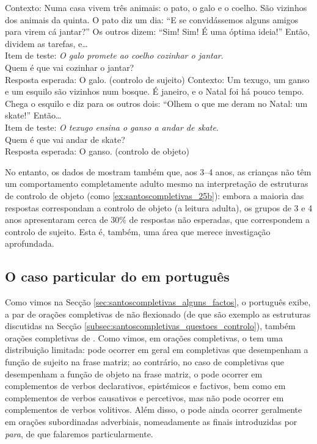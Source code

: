 \documentclass[output=paper]{LSP/langsci}
\begin{document}
\ea\label{ex:santoscompletivas_25}
\ea\label{ex:santoscompletivas_25a} Contexto: Numa casa vivem três animais: o pato, o galo e o coelho. São vizinhos dos animais da quinta. O pato diz um dia: ``E se convidássemos alguns amigos para virem cá jantar?'' Os outros dizem: ``Sim! Sim! É uma óptima ideia!'' Então, dividem as tarefas, e\ldots\\
Item de teste: \textit{O galo promete ao coelho cozinhar o jantar}.\\
Quem é que vai cozinhar o jantar?\\
Resposta esperada: O galo. (controlo de sujeito)
\ex\label{ex:santoscompletivas_25b} Contexto: Um texugo, um ganso e um esquilo são vizinhos num bosque. É janeiro, e o Natal foi há pouco tempo. Chega o esquilo e diz para os outros dois: ``Olhem o que me deram no Natal: um skate!'' Então\ldots\\
Item de teste: \textit{O texugo ensina o ganso a andar de skate}.\\
Quem é que vai andar de skate?\\
Resposta esperada: O ganso. (controlo de objeto)
\zl

No entanto, os dados de \citet{agostinho2014} mostram também que, aos 3--4 anos, as crianças não têm um comportamento completamente adulto mesmo na interpretação de estruturas de controlo de objeto (como \ref{ex:santoscompletivas_25b}): embora a maioria das respostas correspondam a controlo de objeto (a leitura adulta), os grupos de 3 e 4 anos apresentaram cerca de 30\% de respostas não esperadas, que correspondem a controlo de sujeito. Esta é, também, uma área que merece investigação aprofundada.

\subsection{O caso particular do  em português}
\label{subsec:santoscompletivas_caso_particular}

Como vimos na Secção \ref{sec:santoscompletivas_alguns_factos}, o português exibe, a par de orações completivas de  não flexionado (de que são exemplo as estruturas discutidas na Secção \ref{subsec:santoscompletivas_questoes_controlo}), também orações completivas de . Como vimos, em orações completivas, o  tem uma distribuição limitada: pode ocorrer em geral em completivas que desempenham a função de sujeito na frase matriz; ao contrário, no caso de completivas que desempenham a função de objeto na frase matriz, o  pode ocorrer em complementos de verbos declarativos, epistémicos e factivos, bem como em complementos de verbos causativos e percetivos, mas não pode ocorrer em complementos de verbos volitivos. Além disso, o  pode ainda ocorrer geralmente em orações subordinadas adverbiais, nomeadamente as finais introduzidas por \textit{para}, de que falaremos particularmente.
\end{document}
